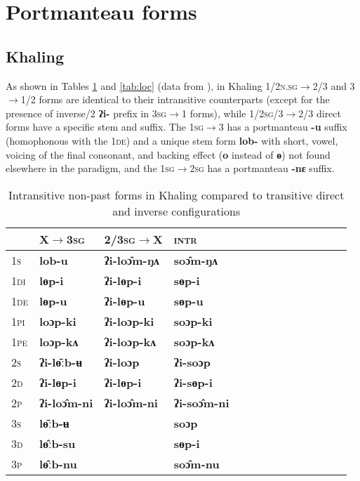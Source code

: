 \documentclass{article}
\newcommand{\ipa}[1]{{\phon\textbf{#1}}}
\newcommand{\grise}[1]{\cellcolor{lightgray}\textbf{#1}}
\newcommand{\bleu}[1]{\cellcolor{blue!20}\textbf{#1}}
\begin{document}
\section{Portmanteau forms}

\subsection{Khaling}
 
As shown in Tables \ref{tab:nonloc} and \ref{tab:loc} (data from \citealt[1102]{jacques12khaling}), in Khaling \textsc{1/2n.sg}$\rightarrow$2/3 and 3$\rightarrow$1/2  forms are identical to their intransitive counterparts (except for the presence of inverse/2 \ipa{ʔi-} prefix in \textsc{3sg}$\rightarrow$1 forms), while \textsc{1/2sg/3}$\rightarrow$2/3 direct forms have a specific stem and suffix. The \textsc{1sg$\rightarrow$3} has a portmanteau \ipa{-u} suffix (homophonous with the \textsc{1de}) and a unique stem form \ipa{lob-} with short, vowel, voicing of the final consonant, and backing effect (\ipa{o} instead of \ipa{ɵ}) not found elsewhere in the paradigm, and the \textsc{1sg$\rightarrow$2sg} has a portmanteau \ipa{-nɛ} suffix.

\begin{table}[H]
\caption{Intransitive non-past forms in Khaling compared to transitive direct and inverse configurations} \label{tab:nonloc} \centering
\begin{tabular}{llllllllllllll}
 \toprule
 &	X$\rightarrow$\textsc{3sg} &	\textsc{2/3sg}$\rightarrow$X &	\textsc{intr} &	\\	
 \midrule
\textsc{1s} &	\ipa{lob-u} \bleu{}&	\ipa{ʔi-loɔ̂m-ŋʌ} &	\ipa{soɔ̂m-ŋʌ} &	\\	
\textsc{1di} &	\ipa{lɵp-i} &	\ipa{ʔi-lɵp-i} &	\ipa{sɵp-i} &	\\	
\textsc{1de} &	\ipa{lɵp-u} &	\ipa{ʔi-lɵp-u} &	\ipa{sɵp-u} &	\\	
\textsc{1pi} &	\ipa{loɔp-ki} &	\ipa{ʔi-loɔp-ki} &	\ipa{soɔp-ki} &	\\	
\textsc{1pe} &	\ipa{loɔp-kʌ} &	\ipa{ʔi-loɔp-kʌ} &	\ipa{soɔp-kʌ} &	\\	
\textsc{2s} &	\ipa{ʔi-lɵ̄ːb-ʉ} \bleu{}&	\ipa{ʔi-loɔp} &	\ipa{ʔi-soɔp} &	\\	
\textsc{2d} &	\ipa{ʔi-lɵp-i} &	\ipa{ʔi-lɵp-i} &	\ipa{ʔi-sɵp-i} &	\\	
\textsc{2p} &	\ipa{ʔi-loɔ̂m-ni} &	\ipa{ʔi-loɔ̂m-ni} &	\ipa{ʔi-soɔ̂m-ni} &	\\	
\textsc{3s} &	\ipa{lɵ̄ːb-ʉ} \bleu{}&	 \grise{} &	\ipa{soɔp} &	\\	
\textsc{3d} &	\ipa{lɵ̂ːb-su} \bleu{}&	\grise{} &	\ipa{sɵp-i} &	\\	
\textsc{3p} &	\ipa{lɵ̂ːb-nu} \bleu{}&	\grise{} &	\ipa{soɔ̂m-nu} &	\\	
\bottomrule
\end{tabular}
\end{table}
\end{document}
